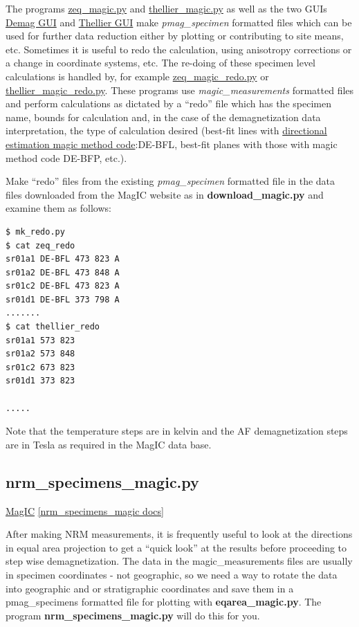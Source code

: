 \documentclass[11pt]{book}
\begin{document}
{{The programs \href{#zeq_magic.py}{zeq\_magic.py} and \href{#thellier_magic.py}{thellier\_magic.py} as well as the two GUIs \href{#demag_gui.py}{Demag GUI} and \href{#thellier_gui.py}{Thellier GUI} make {\it pmag\_specimen} formatted files which can be used for further data reduction either by plotting or contributing to site means, etc.  Sometimes it is useful to redo the calculation, using anisotropy corrections or a change in coordinate systems, etc.  The re-doing of these specimen level calculations is handled by, for example \href{#zeq_magic_redo.py}{zeq\_magic\_redo.py} or \href{#thellier_magic_redo.py}{ thellier\_magic\_redo.py}.  These programs use {\it magic\_measurements} formatted files and perform calculations as dictated by a ``redo'' file which has the specimen name, bounds for calculation and, in the case of the demagnetization data interpretation, the type of calculation desired (best-fit lines with \href{http://earthref.org/cgi-bin/magic-s1-methods.cgi?database_name=magic\qquad &search_start=methods\qquad &category=Direction%20Estimation}{directional estimation magic method code}:{DE-BFL}, best-fit planes with those with  magic method code DE-BFP, etc.).

 Make ``redo'' files from the existing  {\it pmag\_specimen} formatted file in the data files downloaded from the MagIC website as in {\bf download\_magic.py} and examine them as follows:

\begin{verbatim}
$ mk_redo.py
$ cat zeq_redo
sr01a1 DE-BFL 473 823 A
sr01a2 DE-BFL 473 848 A
sr01c2 DE-BFL 473 823 A
sr01d1 DE-BFL 373 798 A
.......
$ cat thellier_redo
sr01a1 573 823
sr01a2 573 848
sr01c2 673 823
sr01d1 373 823

.....
\end{verbatim}

\noindent Note that the temperature steps are in kelvin and the AF demagnetization steps are in Tesla as required in the MagIC data base.



%

\subsection{nrm\_specimens\_magic.py}
\href{#MagIC}{MagIC}
\href{https://github.com/PmagPy/PmagPy/blob/master/programs/nrm_specimens_magic.py}{[nrm\_specimens\_magic docs]}

After making NRM measurements, it is frequently useful to look at the directions in equal area projection to get a ``quick look'' at the results before proceeding to step wise demagnetization.  The data in the magic\_measurements files are usually in specimen coordinates - not geographic, so we need a way to rotate the data into geographic and or stratigraphic coordinates and save them in a pmag\_specimens formatted file for plotting with {\bf eqarea\_magic.py}.   The program {\bf nrm\_specimens\_magic.py} will do this for you.

}}
\end{document}
